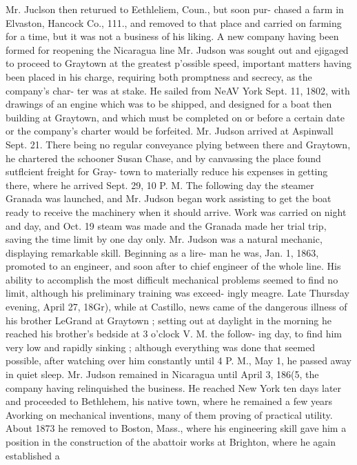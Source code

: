 \documentclass{book}
\begin{document}
Mr. Juclson then returued to Eethleliem, Coun., but soon pur- 
chased a farm in Elvaston, Hancock Co., 111., and removed to 
that place and carried on farming for a time, but it was not a 
business of his liking. A new company having been formed 
for reopening the Nicaragua line Mr. Judson was sought out 
and ejigaged to proceed to Graytown at the greatest p'ossible 
speed, important matters having been placed in his charge, 
requiring both promptness and secrecy, as the company's char- 
ter was at stake. He sailed from NeAV York Sept. 11, 1802, 
with drawings of an engine which was to be shipped, and 
designed for a boat then building at Graytown, and which must 
be completed on or before a certain date or the company's 
charter would be forfeited. Mr. Judson arrived at Aspinwall 
Sept. 21. There being no regular conveyance plying between 
there and Graytown, he chartered the schooner Susan Chase, 
and by canvassing the place found sutflcient freight for Gray- 
town to materially reduce his expenses in getting there, where 
he arrived Sept. 29, 10 P. M. The following day the steamer 
Granada was launched, and Mr. Judson began work assisting 
to get the boat ready to receive the machinery when it should 
arrive. Work was carried on night and day, and Oct. 19 
steam was made and the Granada made her trial trip, saving 
the time limit by one day only. Mr. Judson was a natural 
mechanic, displaying remarkable skill. Beginning as a lire- 
man he was, Jan. 1, 1863, promoted to an engineer, and soon 
after to chief engineer of the whole line. His ability to 
accomplish the most difficult mechanical problems seemed to 
find no limit, although his preliminary training was exceed- 
ingly meagre. Late Thursday evening, April 27, 18Gr), while 
at Castillo, news came of the dangerous illness of his brother 
LeGrand at Graytown ; setting out at daylight in the morning 
he reached his brother's bedside at 3 o'clock V. M. the follow- 
ing day, to find him very low and rapidly sinking ; although 
everything was done that seemed possible, after watching over 
him constantly until 4 P. M., May 1, he passed away in quiet 
sleep. Mr. Judson remained in Nicaragua until April 3, 186(5, 
the company having relinquished the business. He reached 
New York ten days later and proceeded to Bethlehem, his 
native town, where he remained a few years Avorking on 
mechanical inventions, many of them proving of practical 
utility. About 1873 he removed to Boston, Mass., where his 
engineering skill gave him a position in the construction of 
the abattoir works at Brighton, where he again established a 
\end{document}
